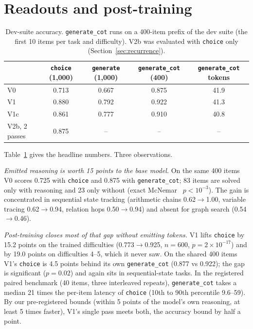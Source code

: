 \documentclass[11pt]{article}
\newcommand{\choiceR}{\texttt{choice}}
\newcommand{\genR}{\texttt{generate}}
\newcommand{\cotR}{\texttt{generate\_cot}}
\begin{document}
\section{Readouts and post-training}
\label{sec:readouts}

\begin{table}[t]
\centering
\small
\begin{tabular}{lcccc}
\toprule
 & \choiceR{} (1,000) & \genR{} (1,000) & \cotR{} (400) & \cotR{} tokens \\
\midrule
V0 & 0.713 & 0.667 & 0.875 & 41.9 \\
V1 & 0.880 & 0.792 & 0.922 & 41.3 \\
V1c & 0.861 & 0.777 & 0.910 & 40.8 \\
V2b, 2 passes & 0.875 & -- & -- & -- \\
\bottomrule
\end{tabular}
\caption{Dev-suite accuracy. \cotR{} runs on a 400-item prefix of the dev suite (the first 10 items
per task and difficulty). V2b was evaluated with \choiceR{} only (Section~\ref{sec:recurrence}).}
\label{tab:readouts}
\end{table}

Table~\ref{tab:readouts} gives the headline numbers. Three observations.

\emph{Emitted reasoning is worth 15 points to the base model.} On the same 400 items V0 scores 0.725
with \choiceR{} and 0.875 with \cotR{}; 83 items are solved only with reasoning and 23 only without
(exact McNemar~\cite{mcnemar1947} $p<10^{-3}$). The gain is concentrated in sequential state tracking
(arithmetic chains 0.62$\to$1.00, variable tracing 0.62$\to$0.94, relation hops 0.50$\to$0.94) and
absent for graph search (0.54$\to$0.46).

\emph{Post-training closes most of that gap without emitting tokens.} V1 lifts \choiceR{} by 15.2
points on the trained difficulties (0.773$\to$0.925, $n=600$, $p=2\times10^{-17}$) and by 19.0 points
on difficulties 4--5, which it never saw. On the shared 400 items V1's \choiceR{} is 4.5 points
behind its own \cotR{} (0.877 vs 0.922); the gap is significant ($p=0.02$) and again sits in
sequential-state tasks. In the registered paired benchmark (40 items, three interleaved repeats),
\cotR{} takes a median 21 times the per-item latency of \choiceR{} (10th to 90th percentile
9.6--59). By our pre-registered bounds (within 5 points of the model's own reasoning, at least 5
times faster), V1's single pass meets both, the accuracy bound by half a point.
\end{document}

